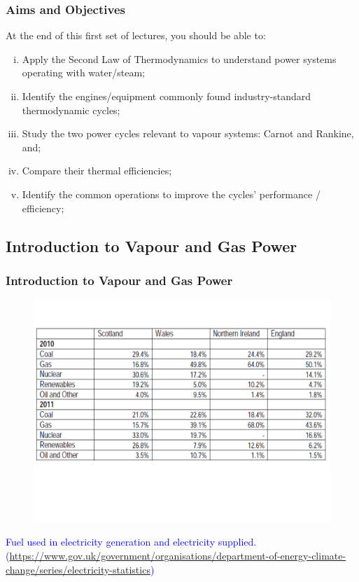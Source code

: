 \documentclass[10pt,compress]{beamer}
\begin{document}
\begin{frame}
   \frametitle{Aims and Objectives}
   At the end of this first set of lectures, you should be able to:
   \begin{enumerate}[(i)]
      \item <2-> Apply the Second Law of Thermodynamics to understand power systems operating with water/steam;
      \item <3-> Identify the engines/equipment commonly found industry-standard thermodynamic cycles; 
      \item <4-> Study the two power cycles relevant to vapour systems: Carnot and Rankine, and; 
      \item <5-> Compare their thermal efficiencies;
      \item <6-> Identify the common operations to improve the cycles' performance / efficiency;
   \end{enumerate}
\end{frame}
 
\subsection{Introduction to Vapour and Gas Power}

\begin{frame}
 \frametitle{Introduction to Vapour and Gas Power}
    \begin{figure}%
     \begin{center}
      \includegraphics[width=9.cm,clip]{./Pics/Energy_Share_UK}
     \end{center}
    \end{figure}
\vspace{-2cm}
\textcolor{blue}{Fuel used in electricity generation and electricity supplied. (\href{https://www.gov.uk/government/organisations/department-of-energy-climate-change/series/electricity-statistics}{https://www.gov.uk/government/organisations/department-of-energy-climate-change/series/electricity-statistics})}
 \normalsize
\end{frame}
\end{document}
